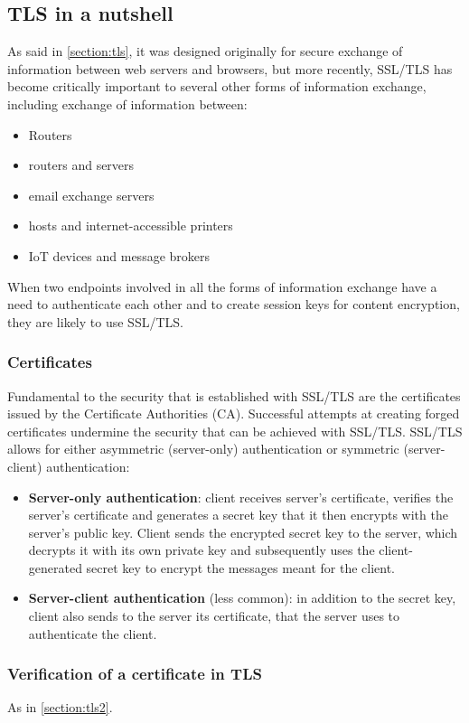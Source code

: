 \documentclass[a4paper, 10pt, titlepage]{article}
\begin{document}
\subsection{TLS in a nutshell}
As said in \ref{section:tls}, it was designed originally for secure exchange of information between web servers and browsers, but more recently, SSL/TLS has become critically important to several other forms of information exchange, including exchange of information between:
\begin{itemize}
\item Routers
\item routers and servers
\item email exchange servers
\item hosts and internet-accessible printers
\item IoT devices and message brokers
\end{itemize}
When two endpoints involved in all the forms of information exchange have a need to authenticate each other and to create session keys for content encryption, they are likely to use SSL/TLS.
\subsubsection*{Certificates}
Fundamental to the security that is established with SSL/TLS are the certificates issued by the Certificate Authorities (CA). Successful attempts at creating forged certificates undermine the security that can be achieved with SSL/TLS. SSL/TLS allows for either asymmetric (server-only) authentication or symmetric (server-client) authentication:
\begin{itemize}
\item \textbf{Server-only authentication}: client receives server’s certificate, verifies the server’s certificate and generates a secret key that it then encrypts with the server’s public key. Client sends the encrypted secret key to the server, which decrypts it with its own private key and subsequently uses the client-generated secret key to encrypt the messages meant for the client.
\item \textbf{Server-client authentication} (less common): in addition to the secret key, client also sends to the server its certificate, that the server uses  to authenticate the client.
\end{itemize}

\subsubsection*{Verification of a certificate in TLS}
As in \ref{section:tls2}.
\end{document}
